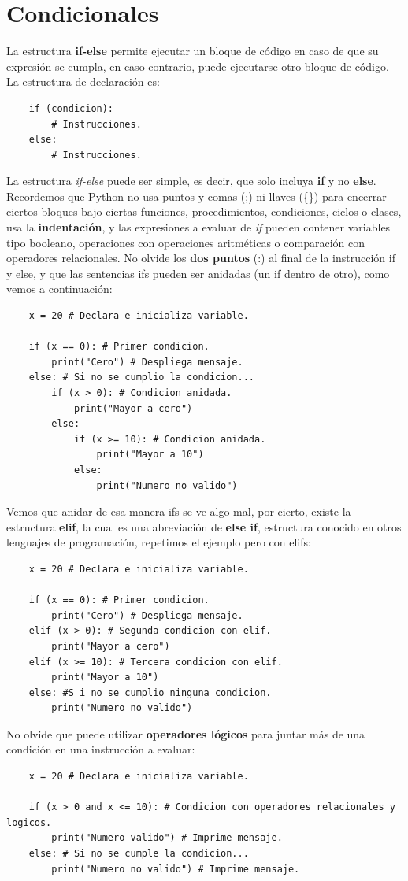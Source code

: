 \section{Condicionales}
\hspace{0.55cm}La estructura \textbf{if-else} permite ejecutar un bloque de código en caso de que su expresión se cumpla, en caso contrario, puede ejecutarse otro bloque de código. La estructura de declaración es:
\begin{lstlisting}
	if (condicion):
		# Instrucciones.
	else:
		# Instrucciones.
\end{lstlisting}

La estructura \textit{if-else} puede ser simple, es decir, que solo incluya \textbf{if} y no \textbf{else}. Recordemos que Python no usa puntos y comas (;) ni llaves (\{\}) para encerrar ciertos bloques bajo ciertas funciones, procedimientos, condiciones, ciclos o clases, usa la \textbf{indentación}, y las expresiones a evaluar de \textit{if} pueden contener variables tipo booleano, operaciones con operaciones aritméticas o comparación con operadores relacionales. No olvide los \textbf{dos puntos} (:) al final de la instrucción if y else, y que las sentencias ifs pueden ser anidadas (un if dentro de otro), como vemos a continuación:
\begin{lstlisting}
	x = 20 # Declara e inicializa variable.
	
	if (x == 0): # Primer condicion.
		print("Cero") # Despliega mensaje.
	else: # Si no se cumplio la condicion...
		if (x > 0): # Condicion anidada.
			print("Mayor a cero")
		else:
			if (x >= 10): # Condicion anidada.
				print("Mayor a 10")
			else:
				print("Numero no valido")
\end{lstlisting}

Vemos que anidar de esa manera ifs se ve algo mal, por cierto, existe la estructura \textbf{elif}, la cual es una abreviación de \textbf{else if}, estructura conocido en otros lenguajes de programación, repetimos el ejemplo pero con elifs:
\begin{lstlisting}
	x = 20 # Declara e inicializa variable.
	
	if (x == 0): # Primer condicion.
		print("Cero") # Despliega mensaje.
	elif (x > 0): # Segunda condicion con elif.
		print("Mayor a cero")
	elif (x >= 10): # Tercera condicion con elif.
		print("Mayor a 10")
	else: #S i no se cumplio ninguna condicion.
		print("Numero no valido")
\end{lstlisting}

No olvide que puede utilizar \textbf{operadores lógicos} para juntar más de una condición en una instrucción a evaluar:
\begin{lstlisting}
	x = 20 # Declara e inicializa variable.
	
	if (x > 0 and x <= 10): # Condicion con operadores relacionales y logicos.
		print("Numero valido") # Imprime mensaje.
	else: # Si no se cumple la condicion...
		print("Numero no valido") # Imprime mensaje.
\end{lstlisting}

